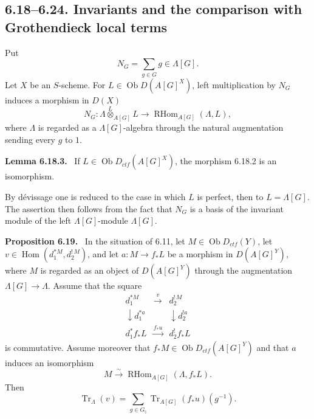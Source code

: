 \documentclass[11pt]{article}
\theoremstyle{plain}
\theoremstyle{definition}
\theoremstyle{remark}
\newenvironment{statement}[1]{\par\medskip\noindent\textbf{#1.}\ }{\par\medskip}
\DeclareMathOperator{\Hom}{Hom}
\DeclareMathOperator{\ob}{Ob}
\DeclareMathOperator{\Tr}{Tr}
\DeclareMathOperator{\RHom}{RHom}
\begin{document}
\subsection*{6.18--6.24. Invariants and the comparison with Grothendieck local terms}

Put
\begin{equation}\tag{6.18.1}
      N_G=\sum_{g\in G}g\in\Lambda[G].
\end{equation}
Let $X$ be an $S$-scheme. For $L\in\ob D(A[G]^X)$, left multiplication by $N_G$
induces a morphism in $D(X)$
\begin{equation}\tag{6.18.2}
      N_G:\Lambda\overset{L}{\otimes}_{A[G]}L
      \longrightarrow \RHom_{A[G]}(\Lambda,L),
\end{equation}
where $\Lambda$ is regarded as a $\Lambda[G]$-algebra through the natural
augmentation sending every $g$ to $1$.

\begin{statement}{Lemma 6.18.3}
If $L\in\ob D_{ctf}(A[G]^X)$, the morphism 6.18.2 is an isomorphism.
\end{statement}

By dévissage one is reduced to the case in which $L$ is perfect, then to
$L=\Lambda[G]$. The assertion then follows from the fact that $N_G$ is a basis of
the invariant module of the left $\Lambda[G]$-module $\Lambda[G]$.

\begin{statement}{Proposition 6.19}
In the situation of 6.11, let $M\in\ob D_{ctf}(Y)$, let
$v\in\Hom(d_1^{*M},d_2^{!\,M})$, and let
$a:M\to f_*L$ be a morphism in $D(A[G]^Y)$, where $M$ is regarded as an object of
$D(A[G]^Y)$ through the augmentation $\Lambda[G]\to\Lambda$. Assume that the square
\[
\begin{array}{ccc}
d_1^{*M} & \xrightarrow{v} & d_2^{!\,M} \\[6pt]
\downarrow\scriptstyle d_1^{*a} & & \downarrow\scriptstyle d_2^{!a} \\[6pt]
d_1^{*}f_*L & \xrightarrow{f_*u} & d_2^{!}f_*L
\end{array}
\]
is commutative. Assume moreover that $f_*M\in\ob D_{ctf}(A[G]^Y)$ and that $a$
induces an isomorphism
\[
       M\xrightarrow{\sim}\RHom_{A[G]}(\Lambda,f_*L).
\]
Then
\begin{equation}\tag{6.19.1}
       \Tr_\Lambda(v)=\sum_{g\in G_\natural}\Tr_{A[G]}(f_*u)(g^{-1}).
\end{equation}
\end{statement}
\end{document}
